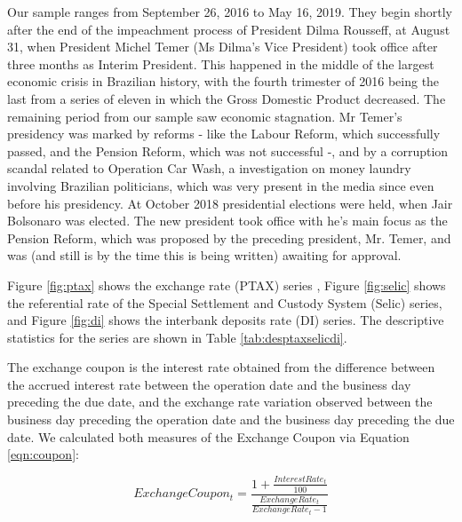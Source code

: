 \documentclass[cic,tc, english]{iiufrgs}
\begin{document}
    Our sample ranges from September 26, 2016 to May 16, 2019. They begin shortly after the end of the impeachment process of President Dilma Rousseff, at August 31, when President Michel Temer (Ms Dilma's Vice President) took office after three months as Interim President. This happened in the middle of the largest economic crisis in Brazilian history, with the fourth trimester of 2016 being the last from a series of eleven in which the Gross Domestic Product decreased. The remaining period from our sample saw economic stagnation. Mr Temer's presidency was marked by reforms - like the Labour Reform, which successfully passed, and the Pension Reform, which was not successful -, and by a corruption scandal related to Operation Car Wash, a investigation on money laundry involving Brazilian politicians, which was very present in the media since even before his presidency. At October 2018 presidential elections were held, when Jair Bolsonaro was elected. The new president took office with he's main focus as the Pension Reform, which was proposed by the preceding president, Mr. Temer, and was (and still is by the time this is being written) awaiting for approval.
    

    Figure \ref{fig:ptax} shows the exchange rate (PTAX) series , Figure \ref{fig:selic} shows the referential rate of the Special Settlement and Custody System (Selic) series, and Figure \ref{fig:di} shows the interbank deposits rate (DI) series. The descriptive statistics for the series are shown in Table \ref{tab:desptaxselicdi}.

    

    

    

    

    The exchange coupon is the interest rate obtained from the difference between the accrued interest rate between the operation date and the business day preceding the due date, and the exchange rate variation observed between the business day preceding the operation date and the business day preceding the due date. We calculated both measures of the Exchange Coupon via Equation \ref{eqn:coupon}:

    \begin{equation}
        \label{eqn:coupon}
        ExchangeCoupon_t = \frac{1 + \frac{InterestRate_t}{100}}{\frac{ExchangeRate_t}{ExchangeRate_t-1}}
    \end{equation}
\end{document}
